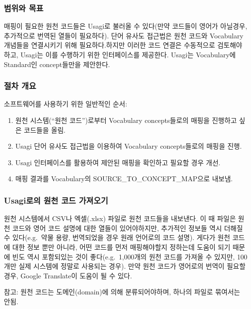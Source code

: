 \documentclass[11pt]{book}
\providecommand{\tightlist}{%
  \setlength{\itemsep}{0pt}\setlength{\parskip}{0pt}}
\theoremstyle{definition}
\theoremstyle{definition}
\theoremstyle{definition}
\theoremstyle{remark}
\begin{document}
\subsubsection*{범위와 목표}\label{--2}

매핑이 필요한 원천 코드들은 Usagi로 불러올 수 있다(만약 코드들이 영어가
아닐경우, 추가적으로 번역된 열들이 필요하다). 단어 유사도 접근법은 원천
코드와 Vocabulary 개념들을 연결시키기 위해 필요하다.하지만 이러한 코드
연결은 수동적으로 검토해야하고, Usagi는 이를 수행하기 위한 인터페이스를
제공한다. Usagi는 Vocabulary에 Standard인 concept들만을 제안한다.

\subsubsection*{절차 개요}\label{--2}

소프트웨어를 사용하기 위한 일반적인 순서:

\begin{enumerate}
\def\labelenumi{\arabic{enumi}.}
\tightlist
\item
  원천 시스템(``원천 코드'')로부터 Vocabulary concepts들로의 매핑을
  진행하고 싶은 코드들을 올림.
\item
  Usagi 단어 유사도 접근법을 이용하여 Vocabulary concepts들로의 매핑을
  진행.
\item
  Usagi 인터페이스를 활용하여 제안된 매핑을 확인하고 필요할 경우 개선.
\item
  매핑 결과를 Vocabulary의 SOURCE\_TO\_CONCEPT\_MAP으로 내보냄.
\end{enumerate}

\subsubsection{Usagi로의 원천 코드 가져오기}\label{usagi---}

원천 시스템에서 CSV나 엑셀(.xlsx) 파일로 원천 코드들을 내보낸다. 이 때
파일은 원천 코드와 영어 코드 설명에 대한 열들이 있어야하지만, 추가적인
정보들 역시 더해질 수 있다(e.g.~약물 용량, 번역되었을 경우 원래 언어로의
코드 설명). 게다가 원천 코드에 대한 정보 뿐만 아니라, 어떤 코드를 먼저
매핑해야할지 정하는데 도움이 되기 때문에 빈도 역시 포함되있는 것이
좋다(e.g.~1,000개의 원천 코드를 가져올 수 있지만, 100개만 실제 시스템에
정말로 사용되는 경우). 만약 원천 코드가 영어로의 번역이 필요할 경우,
Google Translate이 도움이 될 수 있다.

참고: 원천 코드는 도메인(domain)에 의해 분류되어야하며, 하나의 파일로
묶여서는 안됨.
\end{document}
